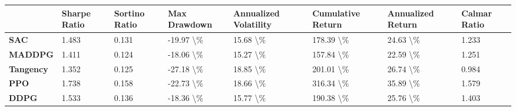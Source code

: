 \begin{tabular}{llllllll}
\toprule
 & Sharpe Ratio & Sortino Ratio & Max Drawdown & Annualized Volatility & Cumulative Return & Annualized Return & Calmar Ratio \\
\midrule
\textbf{SAC} & 1.483 & 0.131 & -19.97 \textbackslash \% & 15.68 \textbackslash \% & 178.39 \textbackslash \% & 24.63 \textbackslash \% & 1.233 \\
\textbf{MADDPG} & 1.411 & 0.124 & -18.06 \textbackslash \% & 15.27 \textbackslash \% & 157.84 \textbackslash \% & 22.59 \textbackslash \% & 1.251 \\
\textbf{Tangency} & 1.352 & 0.125 & -27.18 \textbackslash \% & 18.85 \textbackslash \% & 201.01 \textbackslash \% & 26.74 \textbackslash \% & 0.984 \\
\textbf{PPO} & 1.738 & 0.158 & -22.73 \textbackslash \% & 18.66 \textbackslash \% & 316.34 \textbackslash \% & 35.89 \textbackslash \% & 1.579 \\
\textbf{DDPG} & 1.533 & 0.136 & -18.36 \textbackslash \% & 15.77 \textbackslash \% & 190.38 \textbackslash \% & 25.76 \textbackslash \% & 1.403 \\
\bottomrule
\end{tabular}
